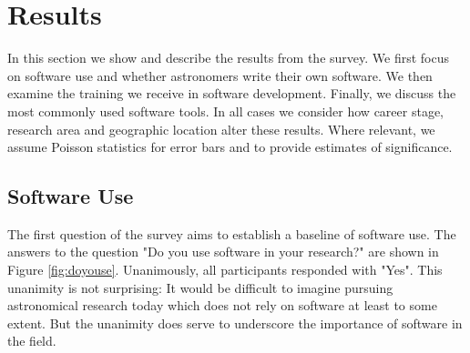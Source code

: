 \section{Results}
\label{sec:res}

In this section we show and describe the results from the survey. We first focus on software use and whether astronomers write their own software. We then examine the training we receive in software development. Finally, we discuss the most commonly used software tools. In all cases we consider how career stage, research area and geographic location alter these results. Where relevant, we assume Poisson statistics for error bars and to provide estimates of significance.

\subsection{Software Use}

The first question of the survey aims to establish a baseline of software use. The answers to the question "Do you use software in your research?" are shown in Figure \ref{fig:doyouse}. Unanimously, all participants responded with "Yes". This unanimity is not surprising: It would be difficult to imagine pursuing astronomical research today which does not rely on software at least to some extent. But the unanimity does serve to underscore the importance of software in the field.
    
    